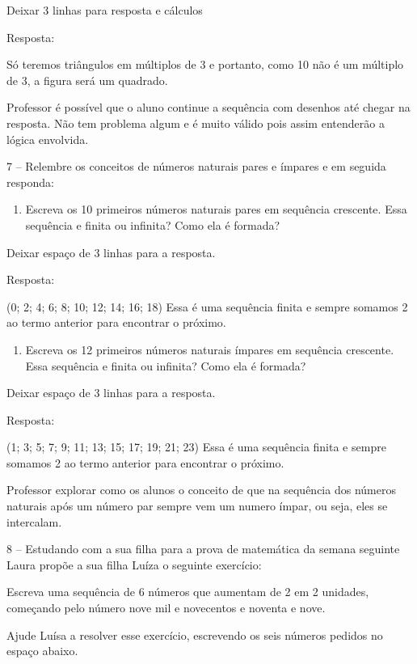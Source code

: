 Deixar 3 linhas para resposta e cálculos

Resposta:

Só teremos triângulos em múltiplos de 3 e portanto, como 10 não é um
múltiplo de 3, a figura será um quadrado.

Professor é possível que o aluno continue a sequência com desenhos até
chegar na resposta. Não tem problema algum e é muito válido pois assim
entenderão a lógica envolvida.

7 -- Relembre os conceitos de números naturais pares e ímpares e em
seguida responda:

\begin{enumerate}
\def\labelenumi{\alph{enumi})}
\item
  Escreva os 10 primeiros números naturais pares em sequência crescente.
  Essa sequência e finita ou infinita? Como ela é formada?
\end{enumerate}

Deixar espaço de 3 linhas para a resposta.

Resposta:

(0; 2; 4; 6; 8; 10; 12; 14; 16; 18) Essa é uma sequência finita e sempre
somamos 2 ao termo anterior para encontrar o próximo.

\begin{enumerate}
\def\labelenumi{\alph{enumi})}
\item
  Escreva os 12 primeiros números naturais ímpares em sequência
  crescente. Essa sequência e finita ou infinita? Como ela é formada?
\end{enumerate}

Deixar espaço de 3 linhas para a resposta.

Resposta:

(1; 3; 5; 7; 9; 11; 13; 15; 17; 19; 21; 23) Essa é uma sequência finita
e sempre somamos 2 ao termo anterior para encontrar o próximo.

Professor explorar como os alunos o conceito de que na sequência dos
números naturais após um número par sempre vem um numero ímpar, ou seja,
eles se intercalam.

8 -- Estudando com a sua filha para a prova de matemática da semana
seguinte Laura propõe a sua filha Luíza o seguinte exercício:

Escreva uma sequência de 6 números que aumentam de 2 em 2 unidades,
começando pelo número nove mil e novecentos e noventa e nove.

Ajude Luísa a resolver esse exercício, escrevendo os seis números
pedidos no espaço abaixo.

